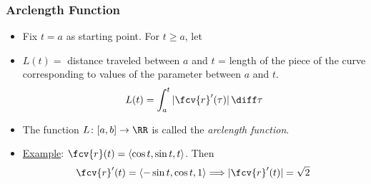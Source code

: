 \begin{frame}
\frametitle{Arclength Function}
\begin{itemize}
\item Fix $t=a$ as starting point. For $t \geqslant a$, let
\item $L(t) = $ distance traveled between $a$ and $t$ = length of the piece of the curve corresponding to values of the parameter between $a$ and $t$.
\[
L(t) =  \int_{a}^t |\fcv{r}'(\tau)| \, \diff \tau 
\]
\item<2-> The function $L\colon [a,b]\to \RR$ is called the \emph{arclength function}.
\item<3-> \underline{Example}: $\fcv{r}(t) = \langle \cos{t}, \sin{t}, t\rangle$. Then
\[\fcv{r}'(t) = \langle -\sin{t}, \cos{t}, 1 \rangle
\Longrightarrow |\fcv{r}'(t)| = \sqrt{2}\; 
\]
\end{itemize}

\end{frame}